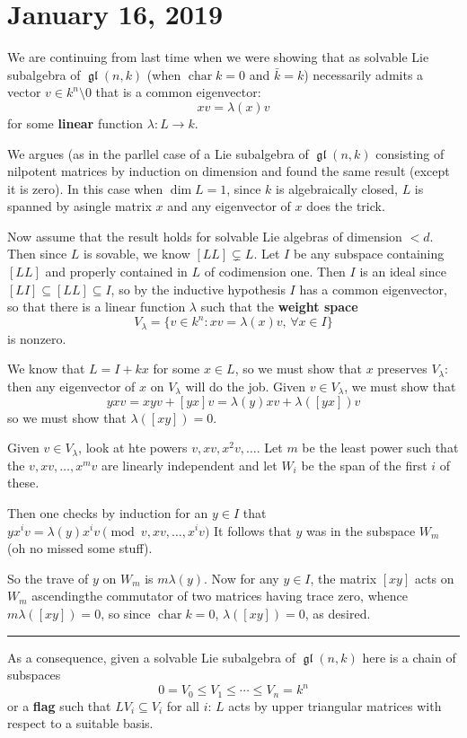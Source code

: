 \documentclass[12pt]{article}
\theoremstyle{nonumberbreak}
\theoremstyle{changebreak}
\theoremstyle{nonumberbreak}
\theoremstyle{change}
\newcommand*{\brk}{
\rule{2in}{.1pt}
}
\DeclareMathOperator{\ch}{char}
\DeclareMathOperator{\gl}{\mathfrak{gl}}
\begin{document}
\section{January 16, 2019}
We are continuing from last time when we were showing that as solvable Lie subalgebra of $\gl(n,k)$
(when $\ch k=0$ and $\bar k=k$) necessarily admits a vector $v\in k^n\setminus 0$ that is
a common eigenvector:
\[xv=\lambda(x)v\]
for some \textbf{linear} function $\lambda:L\to k$.

We argues (as in the parllel case of a Lie subalgebra of $\gl(n,k)$ consisting of nilpotent matrices
by induction on dimension and found the same result (except it is zero). In this case when $\dim L=1$,
since $k$ is algebraically closed, $L$ is spanned by asingle matrix $x$ and any eigenvector of $x$ does the trick.

Now assume that the result holds for solvable Lie algebras of dimension $<d$. Then since $L$ is sovable, we know
$[LL]\subsetneq L$. Let $I$ be any subspace containing $[LL]$ and properly contained in $L$ of codimension one.
Then $I$ is an ideal since $[LI]\subseteq[LL]\subseteq I$, so by the inductive hypothesis $I$ has a common eigenvector, 
so that there is a linear function $\lambda$ such that the \textbf{weight space}
\[V_\lambda=\{v\in k^n:xv=\lambda(x)v,\,\forall x\in I\}\]
is nonzero.

We know that $L=I+kx$ for some $x\in L$, so we must show that $x$ preserves $V_\lambda$: then any eigenvector
of $x$ on $V_\lambda$ will do the job. Given $v\in V_\lambda$, we must show that 
\[yxv=xyv+[yx]v=\lambda(y)xv+\lambda([yx])v\]
so we must show that $\lambda([xy])=0$.

Given $v\in V_\lambda$, look at hte powers $v,xv, x^2v,\dots$. Let $m$ be the least power such that the
$v,xv,\dots,x^mv$ are linearly independent and let $W_i$ be the span of the first $i$ of these.

Then one checks by induction for an $y\in I$ that $yx^iv=\lambda(y)x^iv\pmod{v,xv,\dots,x^iv}$
It follows that $y$ was in the subspace $W_m$ (oh no missed some stuff).

So the trave of $y$ on $W_m$ is $m\lambda(y)$. Now for any $y\in I$, the matrix $[xy]$ acts on $W_m$ ascendingthe commutator of two matrices having trace zero, whence $m\lambda([xy])=0$,
so since $\ch k=0$, $\lambda([xy])=0$, as desired.

\brk

As a consequence, given a solvable Lie subalgebra of $\gl(n,k)$ here is a chain of subspaces
\[0=V_0\le V_1\le\cdots\le V_n=k^n\]
or a \textbf{flag} such that $LV_i\subseteq V_i$ for all $i$: $L$ acts by upper triangular 
matrices with respect to a suitable basis.
\end{document}
